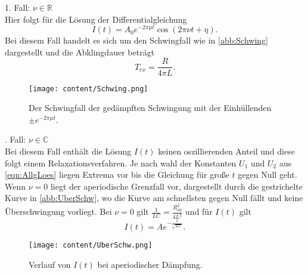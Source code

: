 1. Fall: $\nu\in\mathbb{R}$\\
Hier folgt für die Lösung der Differentialgleichung
\begin{equation}
    I(t) = A_0e^{-2\pi\mu t}\cos(2\pi\nu t + \eta).
\end{equation}
Bei diesem Fall handelt es sich um den Schwingfall wie in \autoref{abb:Schwing} dargestellt und die Abklingdauer beträgt
\begin{equation}
    T_{ex} = \frac{R}{4\pi L}.
\end{equation}
\begin{figure}[H]
    \centering
    \texttt{[image: content/Schwing.png]}
    \caption{Der Schwingfall der gedämpften Schwingung mit der Einhüllenden $\pm e^{-2\pi\mu t}$. \cite{sample}}
    \label{abb:Schwing}
\end{figure}
. Fall: $\nu\in\mathbb{C}$\\
Bei diesem Fall enthält die Lösung $I(t)$ keinen oszillierenden Anteil und diese folgt einem Relaxationsverfahren.
Je nach wahl der Konstanten $U_1$ und $U_2$ aus \eqref{eqn:AllgLoes} liegen Extrema vor bis die Gleichung für große
$t$ gegen Null geht. Wenn $\nu = 0$ liegt der aperiodische Grenzfall vor, dargestellt durch die gestrichelte Kurve in
\autoref{abb:UberSchw}, wo die Kurve am schnellsten gegen Null fällt und keine Überschwingung vorliegt. Bei $\nu = 0$ gilt
$\frac{1}{LC} = \frac{R^2_{ap}}{4L^2}$ und für $I(t)$ gilt
\begin{equation}
    I(t) = Ae^{-\frac{t}{\sqrt{LC}}}.
\end{equation}
\begin{figure}[H]
    \centering
    \texttt{[image: content/UberSchw.png]}
    \caption{Verlauf von $I(t)$ bei aperiodischer Dämpfung. \cite{sample}}
    \label{abb:UberSchw}
\end{figure}
